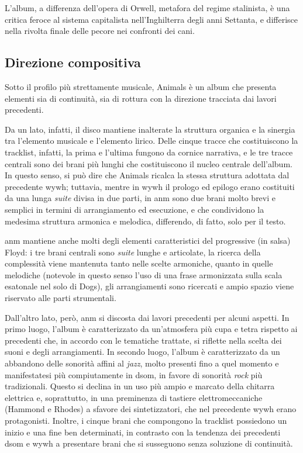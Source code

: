 \documentclass[class=book, crop=false, oneside, 12pt]{standalone}
\begin{document}
    L'album, a differenza dell'opera di Orwell, metafora del regime stalinista, è una critica feroce al sistema capitalista nell'Inghilterra degli anni Settanta, e differisce nella rivolta finale delle pecore nei confronti dei cani.

    \subsection{Direzione compositiva}
    \label{subsec:animals-songwriting}
    Sotto il profilo più strettamente musicale, Animals è un album che presenta elementi sia di continuità, sia di rottura con la direzione tracciata dai lavori precedenti. 
    
    Da un lato, infatti, il disco mantiene inalterate la struttura organica e la sinergia tra l'elemento musicale e l'elemento lirico. Delle cinque tracce che costituiscono la tracklist, infatti, la prima e l'ultima fungono  da cornice narrativa, e le tre tracce centrali sono dei brani più lunghi che costituiscono il nucleo centrale dell'album. In questo senso, si può dire che Animals ricalca la stessa struttura adottata dal precedente \acrlong{wywh}; tuttavia, mentre in \acrshort{wywh} il prologo ed epilogo erano costituiti da una lunga \emph{suite} divisa in due parti, in \acrshort{anm} sono due brani molto brevi e semplici in termini di arrangiamento ed esecuzione, e che condividono la medesima struttura armonica e melodica, differendo, di fatto, solo per il testo. 

    \acrshort{anm} mantiene anche molti degli elementi caratteristici del progressive (in salsa) Floyd: i tre brani centrali sono \emph{suite} lunghe e articolate, la ricerca della complessità viene mantenuta tanto nelle scelte armoniche, quanto in quelle melodiche (notevole in questo senso l'uso di una frase armonizzata sulla scala esatonale nel solo di Dogs), gli arrangiamenti sono ricercati e ampio spazio viene riservato alle parti strumentali.

    Dall'altro lato, però, \acrshort{anm} si discosta dai lavori precedenti per alcuni aspetti. In primo luogo, l'album è caratterizzato da un'atmosfera più cupa e tetra rispetto ai precedenti che, in accordo con le tematiche trattate, si riflette nella scelta dei suoni e degli arrangiamenti. In secondo luogo, l'album è caratterizzato da un abbandono delle sonorità affini al \emph{jazz}, molto presenti fino a quel momento e manifestatesi più compiutamente in \acrshort{dsom}, in favore di sonorità \emph{rock} più tradizionali. Questo si declina  in un uso più ampio e marcato della chitarra elettrica e, soprattutto, in una preminenza di tastiere elettromeccaniche (Hammond e Rhodes) a sfavore dei sintetizzatori, che nel precedente \acrshort{wywh} erano protagonisti. Inoltre, i cinque brani che compongono la tracklist possiedono un inizio e una fine ben determinati, in contrasto con la tendenza dei precedenti \acrshort{dsom} e \acrshort{wywh} a presentare brani che si susseguono senza soluzione di continuità. 
\end{document}
